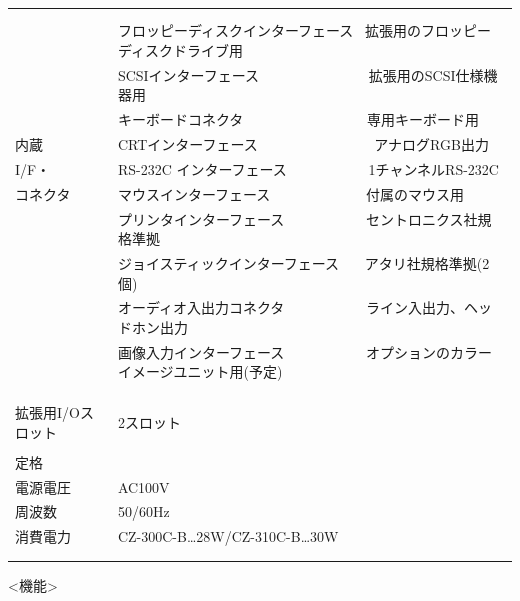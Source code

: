 ﻿\documentclass[twoside,a4paper,12pt]{article}
\begin{document}
\begin{tabular}{|p{17mm}|p{13mm}|p{23mm}|p{80mm}|p{30mm}|}
& \multicolumn{4}{l|}{}\\
\cline{2-5}
& \multicolumn{4}{l|}{}\\[-3mm]
& \multicolumn{4}{l|}{フロッピーディスクインターフェース \ 拡張用のフロッピーディスクドライブ用}\\[2mm]
& \multicolumn{4}{l|}{SCSIインターフェース \ \ \ \ \ \ \ \ \ \ \ \ \ \ \ 拡張用のSCSI仕様機器用}\\[2mm]
& \multicolumn{4}{l|}{キーボードコネクタ \ \ \ \ \ \ \ \ \ \ \ \ \ \ \ \ \ 専用キーボード用}\\
内蔵 & \multicolumn{4}{l|}{CRTインターフェース \ \ \ \ \ \ \ \ \ \ \ \ \ \ \ \ アナログRGB出力}\\
I/F・ & \multicolumn{4}{l|}{RS-232C インターフェース \ \ \ \ \ \ \ \ \ \ \ 1チャンネルRS-232C}\\
コネクタ & \multicolumn{4}{l|}{マウスインターフェース \ \ \ \ \ \ \ \ \ \ \ \ \ 付属のマウス用}\\
& \multicolumn{4}{l|}{プリンタインターフェース \ \ \ \ \ \ \ \ \ \ \ セントロニクス社規格準拠}\\
& \multicolumn{4}{l|}{ジョイスティックインターフェース \ \ \ アタリ社規格準拠(2個)}\\
& \multicolumn{4}{l|}{オーディオ入出力コネクタ \ \ \ \ \ \ \ \ \ \ \ ライン入出力、ヘッドホン出力}\\
& \multicolumn{4}{l|}{画像入力インターフェース \ \ \ \ \ \ \ \ \ \ \ オプションのカラーイメージユニット用(予定)}\\
& \multicolumn{4}{l|}{}\\
& \multicolumn{4}{l|}{}\\
\hline
\multicolumn{3}{|l|}{} & \multicolumn{2}{l|}{}\\[-3mm]
\multicolumn{3}{|l|}{拡張用I/Oスロット} & \multicolumn{2}{l|}{2スロット}\\
\hline
& \multicolumn{4}{l|}{}\\[-3mm]
定格 & \multicolumn{4}{l|}{}\\
電源電圧 & \multicolumn{4}{l|}{AC100V}\\
周波数 & \multicolumn{4}{l|}{50/60Hz}\\
消費電力 & \multicolumn{4}{l|}{CZ-300C-B…28W/CZ-310C-B…30W}\\
& \multicolumn{4}{l|}{}\\
& \multicolumn{4}{l|}{}\\
\hline
\end{tabular}

\newpage

<機能>
\end{document}
